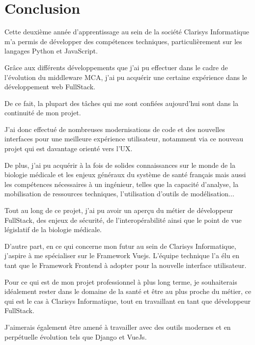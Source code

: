 \chapter{Conclusion}
Cette deuxième année d’apprentissage au sein de la société Clarisys Informatique m’a permis de développer des compétences techniques, particulièrement sur les langages Python et JavaScript.

Grâce aux différents développements que j’ai pu effectuer dans le cadre de l’évolution du middleware MCA, j’ai pu acquérir une certaine expérience dans le développement web FullStack. 

De ce fait, la plupart des tâches qui me sont confiées aujourd’hui sont dans la continuité de mon projet. 

J’ai donc effectué de nombreuses modernisations de code et des nouvelles interfaces pour une meilleure expérience utilisateur, notamment via ce nouveau projet qui est davantage orienté vers l’UX.

De plus, j’ai pu acquérir à la fois de solides connaissances sur le monde de la biologie médicale et les enjeux généraux du système de santé français mais aussi les compétences nécessaires à un ingénieur, telles que la capacité d’analyse, la mobilisation de ressources techniques, l’utilisation d’outils de modélisation...

Tout au long de ce projet, j’ai pu avoir un aperçu du métier de développeur FullStack, des enjeux de sécurité, de l’interopérabilité ainsi que le point de vue législatif de la biologie médicale.

D’autre part, en ce qui concerne mon futur au sein de Clarisys Informatique, j’aspire à me spécialiser sur le Framework Vuejs. L’équipe technique l’a élu en tant que le Framework Frontend à adopter pour la nouvelle interface utilisateur.

 Pour ce qui est de mon projet professionnel à plus long terme, je souhaiterais idéalement rester dans le domaine de la santé et être au plus proche du métier, ce qui est le cas à Clarisys Informatique, tout en travaillant en tant que développeur FullStack. 

J’aimerais également être amené à travailler avec des outils modernes et en perpétuelle évolution tels que Django et VueJs.
